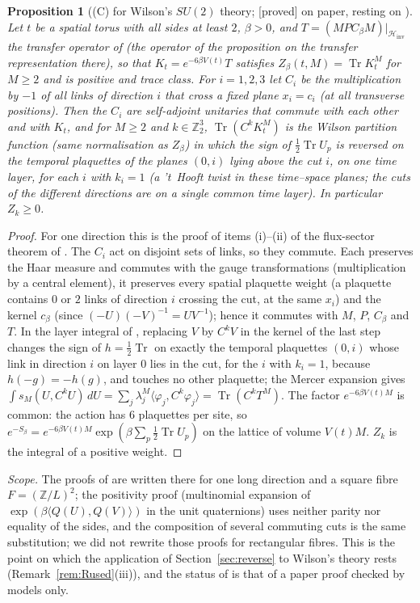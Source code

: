 \documentclass[11pt,a4paper]{article}
\theoremstyle{plain}
\newtheorem{proposition}[theorem]{Proposition}
\theoremstyle{definition}
\theoremstyle{remark}
\numberwithin{equation}{section}
\newcommand{\Z}{\mathbb{Z}}
\newcommand{\Tr}{\operatorname{Tr}}
\newcommand{\Hinv}{\mathcal{H}_{\mathrm{inv}}}
\newcommand{\st}[1]{\textsf{[#1]}}
\begin{document}
\begin{proposition}[(C) for Wilson's $SU(2)$ theory; \st{proved} on paper, resting on \cite{TBv12}]\label{prop:wilsonC}
Let $t$ be a spatial torus with all sides at least $2$, $\beta>0$, and $T=(MPC_\beta M)|_{\Hinv}$ the transfer operator of \cite{TBv12} (the operator of the proposition on the transfer representation there), so that $K_t=e^{-6\beta V(t)}T$ satisfies $Z_\beta(t,M)=\Tr K_t^M$ for $M\ge2$ and is positive and trace class. For $i=1,2,3$ let $C_i$ be the multiplication by $-1$ of all links of direction $i$ that cross a fixed plane $x_i=c_i$ (at all transverse positions). Then the $C_i$ are self-adjoint unitaries that commute with each other and with $K_t$, and for $M\ge2$ and $k\in\Z_2^3$, $\Tr(C^kK_t^M)$ is the Wilson partition function (same normalisation as $Z_\beta$) in which the sign of $\frac12\Tr U_p$ is reversed on the temporal plaquettes of the planes $(0,i)$ lying above the cut $i$, on one time layer, for each $i$ with $k_i=1$ (a 't~Hooft twist in these time--space planes; the cuts of the different directions are on a single common time layer). In particular $Z_k\ge0$.
\end{proposition}
\begin{proof}
For one direction this is the proof of items (i)--(ii) of the flux-sector theorem of \cite{TBv12}. The $C_i$ act on disjoint sets of links, so they commute. Each preserves the Haar measure and commutes with the gauge transformations (multiplication by a central element), it preserves every spatial plaquette weight (a plaquette contains $0$ or $2$ links of direction $i$ crossing the cut, at the same $x_i$) and the kernel $c_\beta$ (since $(-U)(-V)^{-1}=UV^{-1}$); hence it commutes with $M$, $P$, $C_\beta$ and $T$. In the layer integral of \cite{TBv12}, replacing $V$ by $C^kV$ in the kernel of the last step changes the sign of $h=\frac12\Tr$ on exactly the temporal plaquettes $(0,i)$ whose link in direction $i$ on layer $0$ lies in the cut, for the $i$ with $k_i=1$, because $h(-g)=-h(g)$, and touches no other plaquette; the Mercer expansion gives $\int s_M(U,C^kU)\,dU=\sum_j\lambda_j^M\langle\varphi_j,C^k\varphi_j\rangle=\Tr(C^kT^M)$. The factor $e^{-6\beta V(t)M}$ is common: the action has $6$ plaquettes per site, so $e^{-S_\beta}=e^{-6\beta V(t)M}\exp(\beta\sum_p\frac12\Tr U_p)$ on the lattice of volume $V(t)M$. $Z_k$ is the integral of a positive weight.
\end{proof}
\emph{Scope.} The proofs of \cite{TBv12} are written there for one long direction and a square fibre $F=(\Z/L)^2$; the positivity proof (multinomial expansion of $\exp(\beta\langle Q(U),Q(V)\rangle)$ in the unit quaternions) uses neither parity nor equality of the sides, and the composition of several commuting cuts is the same substitution; we did not rewrite those proofs for rectangular fibres. This is the point on which the application of Section~\ref{sec:reverse} to Wilson's theory rests (Remark~\ref{rem:Rused}(iii)), and the status of \cite{TBv12} is that of a paper proof checked by models only.
\end{document}
